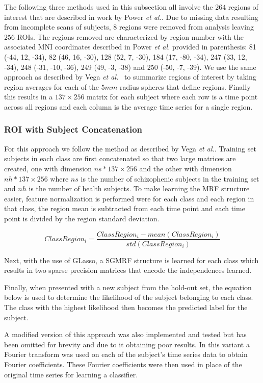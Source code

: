\documentclass{article} %
\begin{document}
The following three methods used in this subsection all involve the $264$  
regions of interest that are described in work by Power \emph{et al.}.
Due to missing data resulting from incomplete scans of subjects, $8$
regions were removed from analysis leaving $256$ ROIs. The regions removed
are characterized by region number with the associated MNI coordinates 
described in Power \emph{et al.} provided in parenthesis: 81 (-44, 12, -34), 
82 (46, 16, -30), 128 (52, 7, -30), 184 (17, -80, -34), 247 (33, 12, -34), 
248 (-31, -10, -36), 249 (49, -3, -38) and 250 (-50, -7, -39). We use the
same approach as described by Vega \emph{et al.}~\cite{rvega} to summarize
regions of interest by taking region averages for each of the $5mm$ radius
spheres that define regions. Finally this results in a $137 \times 256$ matrix
for each subject where each row is a time point across all regions and each
column is the average time series for a single region.

\subsubsection{ROI with Subject Concatenation}
For this approach we follow the method as described by Vega \emph{et al.}.
Training set subjects in each class are first concatenated so that two large 
matrices are created, one with dimension $ns * 137 \times 256$ and the other 
with dimension $nh * 137 \times 256$ where $ns$ is the number of schizophenic 
subjects in the training set and $nh$ is the number of health subjects. To
make learning the MRF structure easier, feature normalization is performed
were for each class and each region in that class, the region mean is 
subtracted from each time point and each time point is divided by the 
region standard deviation.

\begin{equation}
ClassRegion_i = \frac{ClassRegion_i - mean(ClassRegion_i)}{std(ClassRegion_i)}
\end{equation}

Next, with the use of GLasso, a SGMRF structure is learned for each class 
which results in two sparse precision matrices that encode the independences
learned. 

Finally, when presented with a new subject from the hold-out set, the equation
below is used to determine the likelihood of the subject belonging to each
class. The class with the highest likelihood then becomes the predicted label
for the subject.

A modified version of this approach was also implemented and tested but has
been omitted for brevity and due to it obtaining poor results. In this variant
a Fourier transform was used on each of the subject's time series data to 
obtain Fourier coefficients. These Fourier coefficients were then used in 
place of the original time series for learning a classifier.
\end{document}
